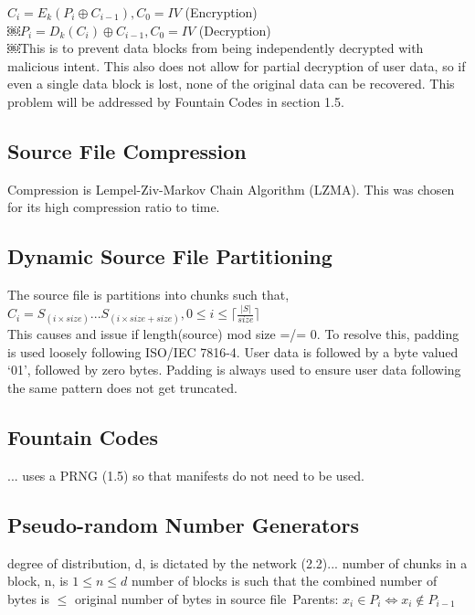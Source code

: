 \documentclass[journal]{IEEEtran}
\begin{document}
$C_i = E_k(P_i \oplus{} C_{i-1}), C_0 = IV$ (Encryption)\\
$￼P_i = D_k(C_i) \oplus{} C_{i-1}, C_0 = IV$ (Decryption)\\

￼This is to prevent data blocks from being independently decrypted with malicious intent. This also does not allow for partial decryption of user data, so if even a single data block is lost, none of the original data can be recovered. This problem will be addressed by Fountain Codes in section 1.5.

\subsection{Source File Compression}
Compression is Lempel-Ziv-Markov Chain Algorithm (LZMA). This was chosen for its high compression ratio to time.

\subsection{Dynamic Source File Partitioning}
The source file is partitions into chunks such that,\\

$C_i = S_{(i \times{} size)} ... S_{(i \times{} size + size)}, 0 \le i \le \lceil{\frac{\left\vert{S}\right\vert}{size}}\rceil$ \\


This causes and issue if length(source) mod size =/= 0. To resolve this, padding is used loosely following ISO/IEC 7816-4. User data is followed by a byte valued ‘01’, followed by zero bytes. Padding is always used to ensure user data following the same pattern does not get truncated.

\subsection{Fountain Codes}
... uses a PRNG (1.5) so that manifests do not need to be used.

\subsection{Pseudo-random Number Generators}
degree of distribution, d, is dictated by the network (2.2)... number of chunks in a block, n, is $1 \le n \le d$
number of blocks is such that the combined number of bytes is $\le$ original number of bytes in source file\
Parents: $x_i \in P_i \iff x_i \notin P_{i-1}$
\end{document}
